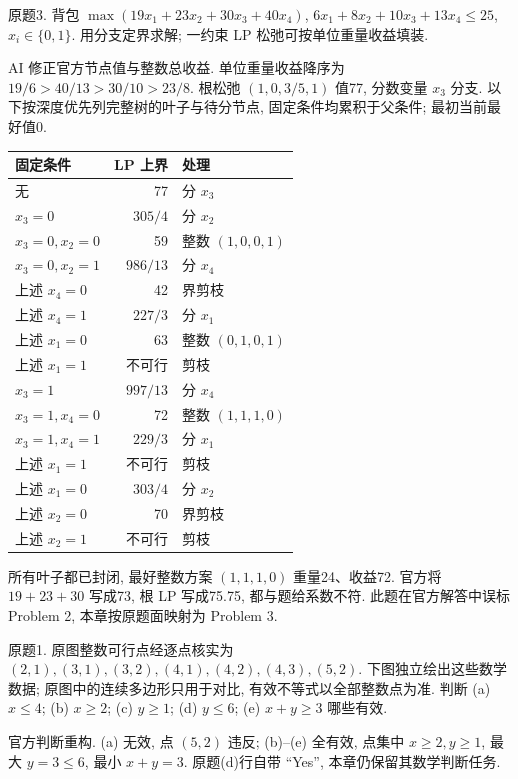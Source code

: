 \begin{exercise}\label{ass:15053-rec7-q3}
原题3. 背包 $\max(19x_1+23x_2+30x_3+40x_4)$, $6x_1+8x_2+10x_3+13x_4\le25$, $x_i\in\{0,1\}$. 用分支定界求解; 一约束 LP 松弛可按单位重量收益填装.
\end{exercise}
\begin{solution}
AI 修正官方节点值与整数总收益. 单位重量收益降序为 $19/6>40/13>30/10>23/8$. 根松弛 $(1,0,3/5,1)$ 值77, 分数变量 $x_3$ 分支. 以下按深度优先列完整树的叶子与待分节点, 固定条件均累积于父条件; 最初当前最好值0.
\begin{center}\begin{tabular}{l|r|l}
固定条件&LP 上界&处理\\\hline
无&77&分 $x_3$\\
$x_3=0$&$305/4$&分 $x_2$\\
$x_3=0,x_2=0$&59&整数 $(1,0,0,1)$\\
$x_3=0,x_2=1$&$986/13$&分 $x_4$\\
上述 $x_4=0$&42&界剪枝\\
上述 $x_4=1$&$227/3$&分 $x_1$\\
上述 $x_1=0$&63&整数 $(0,1,0,1)$\\
上述 $x_1=1$&不可行&剪枝\\
$x_3=1$&$997/13$&分 $x_4$\\
$x_3=1,x_4=0$&72&整数 $(1,1,1,0)$\\
$x_3=1,x_4=1$&$229/3$&分 $x_1$\\
上述 $x_1=1$&不可行&剪枝\\
上述 $x_1=0$&$303/4$&分 $x_2$\\
上述 $x_2=0$&70&界剪枝\\
上述 $x_2=1$&不可行&剪枝
\end{tabular}\end{center}
所有叶子都已封闭, 最好整数方案 $(1,1,1,0)$ 重量24、收益72. 官方将 $19+23+30$ 写成73, 根 LP 写成75.75, 都与题给系数不符. 此题在官方解答中误标 Problem 2, 本章按原题面映射为 Problem 3.
\end{solution}

\begin{exercise}\label{ass:15053-rec8-q1}
原题1. 原图整数可行点经逐点核实为 $(2,1),(3,1),(3,2),(4,1),(4,2),(4,3),(5,2)$. 下图独立绘出这些数学数据; 原图中的连续多边形只用于对比, 有效不等式以全部整数点为准. 判断 (a) $x\le4$; (b) $x\ge2$; (c) $y\ge1$; (d) $y\le6$; (e) $x+y\ge3$ 哪些有效.
\begin{center}\end{center}
\end{exercise}
\begin{solution}
官方判断重构. (a) 无效, 点 $(5,2)$ 违反; (b)--(e) 全有效, 点集中 $x\ge2,y\ge1$, 最大 $y=3\le6$, 最小 $x+y=3$. 原题(d)行自带 ``Yes'', 本章仍保留其数学判断任务.
\end{solution}

